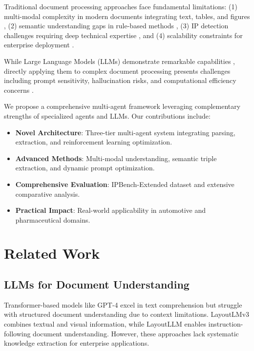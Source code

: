 \documentclass[11pt,a4paper]{article}
\begin{document}
Traditional document processing approaches face fundamental limitations: (1) multi-modal complexity in modern documents integrating text, tables, and figures \citep{li2024layoutlmv3}, (2) semantic understanding gaps in rule-based methods \citep{qiu2020pre}, (3) IP detection challenges requiring deep technical expertise \citep{aristodemou2024patent}, and (4) scalability constraints for enterprise deployment \citep{brown2020language}.

While Large Language Models (LLMs) demonstrate remarkable capabilities \citep{openai2023gpt4, touvron2023llama}, directly applying them to complex document processing presents challenges including prompt sensitivity, hallucination risks, and computational efficiency concerns \citep{zhang2023instruction}.

We propose a comprehensive multi-agent framework leveraging complementary strengths of specialized agents and LLMs. Our contributions include:

\begin{itemize}
  \item \textbf{Novel Architecture}: Three-tier multi-agent system integrating parsing, extraction, and reinforcement learning optimization.
  \item \textbf{Advanced Methods}: Multi-modal understanding, semantic triple extraction, and dynamic prompt optimization.
  \item \textbf{Comprehensive Evaluation}: IPBench-Extended dataset and extensive comparative analysis.
  \item \textbf{Practical Impact}: Real-world applicability in automotive and pharmaceutical domains.
\end{itemize}

\section{Related Work}

\subsection{LLMs for Document Understanding}
Transformer-based models like GPT-4 \citep{openai2023gpt4} excel in text comprehension but struggle with structured document understanding due to context limitations. LayoutLMv3 \citep{li2024layoutlmv3} combines textual and visual information, while LayoutLLM \citep{huang2024layoutllm} enables instruction-following document understanding. However, these approaches lack systematic knowledge extraction for enterprise applications.
\end{document}
